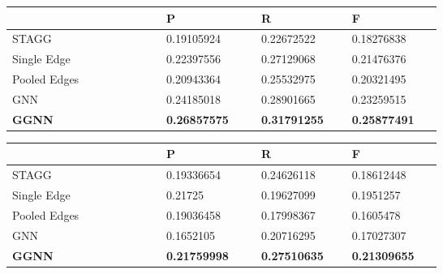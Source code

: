\documentclass[11pt]{article}
\begin{document}
\begin{figure}[t]
  \begin{minipage}{0.49\linewidth}   
  \begin{center}
  \begin{tabular}{p{0.275\linewidth}
  >{\raggedleft}p{0.15\linewidth}
  >{\raggedleft}p{0.125\linewidth}      
  >{\raggedleft\arraybackslash}p{0.125\linewidth}}
  \toprule 
  & P & R &  F \\
  \midrule
  STAGG  & \num{0.19105924} & \num{0.22672522} & \num{0.18276838} \\   \midrule  
  Single Edge  & \num{0.22397556} & \num{0.27129068} & \num{0.21476376} \\   Pooled Edges   & \num{0.20943364} & \num{0.25532975} & \num{0.20321495}\\   GNN   & \num{0.24185018} & \num{0.28901665} & \num{0.23259515}\\      \textbf{GGNN}   & \textbf{\num{0.26857575}} & \textbf{\num{0.31791255}} & \textbf{\num{0.25877491}}\\
  \bottomrule
  \end{tabular} 
  \end{center}
  \end{minipage}\hfill \begin{minipage}{0.49\linewidth}  
    \begin{center}
      \begin{tabular}{p{0.275\linewidth}
        >{\raggedleft}p{0.15\linewidth}
        >{\raggedleft}p{0.125\linewidth}      
        >{\raggedleft\arraybackslash}p{0.125\linewidth}}
    \toprule 
    & P & R &  F \\
    \midrule
    STAGG &  \num{0.19336654} & \num{0.24626118} & \num{0.18612448} \\
    \midrule  
    Single Edge  & \num{0.21725} & \num{0.19627099} & \num{0.1951257} \\
    Pooled Edges   & \num{0.19036458} & \num{0.17998367} & \num{0.1605478}\\
    GNN & \num{0.1652105} & \num{0.20716295} & \num{0.17027307}\\
    \textbf{GGNN}  & \textbf{\num{0.21759998}} & \textbf{\num{0.27510635}} & \textbf{\num{0.21309655}}\\
    \bottomrule
    \end{tabular} 
    \end{center}
  \end{minipage}
  \end{figure}
  
\end{document}
